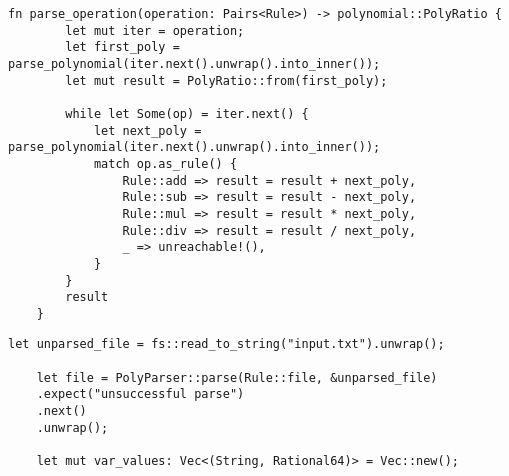 \begin{lstlisting}[caption={The implementation of the \texttt{parse\_operation()} function}, label={lst:parse-operation}]
    fn parse_operation(operation: Pairs<Rule>) -> polynomial::PolyRatio {
        let mut iter = operation;
        let first_poly = parse_polynomial(iter.next().unwrap().into_inner());
        let mut result = PolyRatio::from(first_poly);
    
        while let Some(op) = iter.next() {
            let next_poly = parse_polynomial(iter.next().unwrap().into_inner());
            match op.as_rule() {
                Rule::add => result = result + next_poly,
                Rule::sub => result = result - next_poly,
                Rule::mul => result = result * next_poly,
                Rule::div => result = result / next_poly,
                _ => unreachable!(),
            }
        }
        result
    }        
\end{lstlisting}

\begin{lstlisting}[caption={Reading and parsing user input, and defining storage for custom variable values}, label={lst:reading-parsing-input}]
    let unparsed_file = fs::read_to_string("input.txt").unwrap();

    let file = PolyParser::parse(Rule::file, &unparsed_file)
    .expect("unsuccessful parse")
    .next()
    .unwrap();

    let mut var_values: Vec<(String, Rational64)> = Vec::new();
\end{lstlisting}

